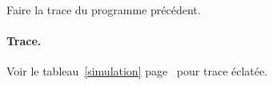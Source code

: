   \begin{newenu}
\item Faire la trace du programme précédent.

\begin{correction}

  \paragraph{Trace.}

  Voir le tableau~\ref{simulation} page~\pageref{simulation} pour
  trace éclatée.




\end{correction}
\end{newenu}
